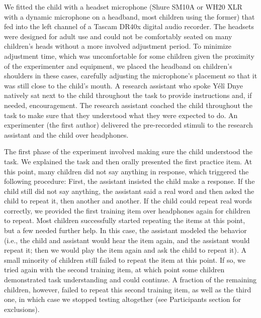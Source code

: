 \documentclass[english,,man,floatsintext]{apa6}
\begin{document}
We fitted the child with a headset microphone (Shure SM10A or WH20 XLR
with a dynamic microphone on a headband, most children using the former)
that fed into the left channel of a Tascam DR40x digital audio recorder.
The headsets were designed for adult use and could not be comfortably
seated on many children's heads without a more involved adjustment
period. To minimize adjustment time, which was uncomfortable for some
children given the proximity of the experimenter and equipment, we
placed the headband on children's shoulders in these cases, carefully
adjusting the microphone's placement so that it was still close to the
child's mouth. A research assistant who spoke Yélî Dnye natively sat
next to the child throughout the task to provide instructions and, if
needed, encouragement. The research assistant coached the child
throughout the task to make sure that they understood what they were
expected to do. An experimenter (the first author) delivered the
pre-recorded stimuli to the research assistant and the child over
headphones.

The first phase of the experiment involved making sure the child
understood the task. We explained the task and then orally presented the
first practice item. At this point, many children did not say anything
in response, which triggered the following procedure: First, the
assistant insisted the child make a response. If the child still did not
say anything, the assistant said a real word and then asked the child to
repeat it, then another and another. If the child could repeat real
words correctly, we provided the first training item over headphones
again for children to repeat. Most children successfully started
repeating the items at this point, but a few needed further help. In
this case, the assistant modeled the behavior (i.e., the child and
assistant would hear the item again, and the assistant would repeat it;
then we would play the item again and ask the child to repeat it). A
small minority of children still failed to repeat the item at this
point. If so, we tried again with the second training item, at which
point some children demonstrated task understanding and could continue.
A fraction of the remaining children, however, failed to repeat this
second training item, as well as the third one, in which case we stopped
testing altogether (see Participants section for exclusions).
\end{document}
